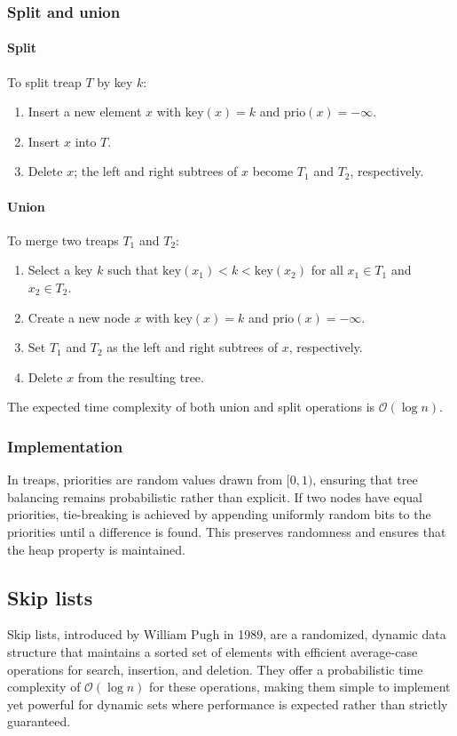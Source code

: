 \subsubsection{Split and union}
\paragraph*{Split}
To split treap $T$ by key $k$:
\begin{enumerate}
    \item Insert a new element $x$ with $\text{key}(x) = k$ and $\text{prio}(x) = -\infty$.
    \item Insert $x$ into $T$.
    \item Delete $x$; the left and right subtrees of $x$ become $T_1$ and $T_2$, respectively.
\end{enumerate}

\paragraph*{Union}
To merge two treaps $T_1$ and $T_2$:
\begin{enumerate}
    \item Select a key $k$ such that $\text{key}(x_1) < k < \text{key}(x_2)$ for all $x_1 \in T_1$ and $x_2 \in T_2$. 
    \item Create a new node $x$ with $\text{key}(x) = k$ and $\text{prio}(x) = -\infty$. 
    \item Set $T_1$ and $T_2$ as the left and right subtrees of $x$, respectively. 
    \item Delete $x$ from the resulting tree.
\end{enumerate}
\begin{lemma} 
    The expected time complexity of both union and split operations is $\mathcal{O}(\log n)$.
\end{lemma}

\subsubsection{Implementation}
In treaps, priorities are random values drawn from $[0, 1)$, ensuring that tree balancing remains probabilistic rather than explicit.
If two nodes have equal priorities, tie-breaking is achieved by appending uniformly random bits to the priorities until a difference is found. 
This preserves randomness and ensures that the heap property is maintained.

\subsection{Skip lists}
Skip lists, introduced by William Pugh in 1989, are a randomized, dynamic data structure that maintains a sorted set of elements with efficient average-case operations for search, insertion, and deletion.
They offer a probabilistic time complexity of $\mathcal{O}(\log n)$ for these operations, making them simple to implement yet powerful for dynamic sets where performance is expected rather than strictly guaranteed.

